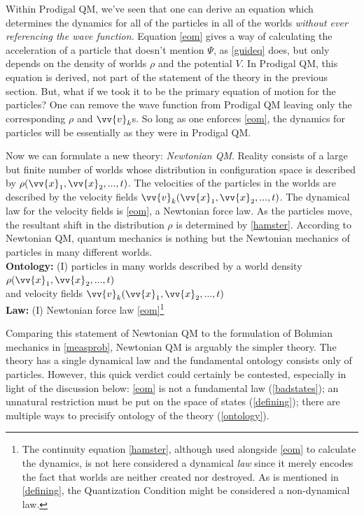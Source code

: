 \documentclass[12pt,secnumarabic,balancelastpage,amsmath,amssymb,nofootinbib]{article}
\begin{document}
Within Prodigal QM, we've seen that one can derive an equation which determines the dynamics for all of the particles in all of the worlds \emph{without ever referencing the wave function}.  Equation \eqref{eom} gives a way of calculating the acceleration of a particle that doesn't mention $\Psi$, as \eqref{guideq} does, but only depends on the density of worlds $\rho$ and the potential $V$.  In Prodigal QM, this equation is derived, not part of the statement of the theory in the previous section.  But, what if we took it to be the primary equation of motion for the particles?  One can remove the wave function from Prodigal QM leaving only the corresponding $\rho$ and $\vv{v}_k$s.  So long as one enforces \eqref{eom}, the dynamics for particles will be essentially as they were in Prodigal QM.

Now we can formulate a new theory: \emph{Newtonian QM}.  Reality consists of a large but finite number of worlds whose distribution in configuration space is described by $\rho(\vv{x}_1,\vv{x}_2,...,t)$.  The velocities of the particles in the worlds are described by the velocity fields $\vv{v}_k(\vv{x}_1,\vv{x}_2,...,t)$.  The dynamical law for the velocity fields is \eqref{eom}, a Newtonian force law.  As the particles move, the resultant shift in the distribution $\rho$ is determined by \eqref{hamster}.  According to Newtonian QM, quantum mechanics is nothing but the Newtonian mechanics of particles in many different worlds.
\vspace*{6 pt}\\\hspace*{1.2cm}\textbf{Ontology:} (I) particles in many worlds described by a world density $\rho(\vv{x}_1,\vv{x}_2,...,t)$
\\\hspace*{1.2cm}and velocity fields $\vv{v}_k(\vv{x}_1,\vv{x}_2,...,t)$
\\\hspace*{1.2cm}\textbf{Law:} (I) Newtonian force law \eqref{eom}\footnote{The continuity equation \eqref{hamster}, although used alongside \eqref{eom} to calculate the dynamics, is not here considered a dynamical \emph{law} since it merely encodes the fact that worlds are neither created nor destroyed.  As is mentioned in \textsection \ref{defining}, the Quantization Condition might be considered a non-dynamical law.}\vspace*{6 pt}

Comparing this statement of Newtonian QM to the formulation of Bohmian mechanics in \textsection \ref{measprob}, Newtonian QM is arguably the simpler theory.  The theory has a single dynamical law and the fundamental ontology consists only of particles.  However, this quick verdict could certainly be contested, especially in light of the discussion below: \eqref{eom} is not a fundamental law (\textsection \ref{badstates}); an unnatural restriction must be put on the space of states (\textsection \ref{defining}); there are multiple ways to precisify ontology of the theory (\textsection \ref{ontology}).
\end{document}
